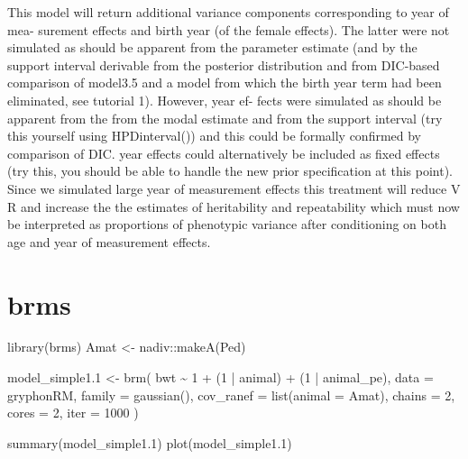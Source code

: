 \documentclass[
  12pt,
]{book}
\newenvironment{Shaded}{\begin{snugshade}}{\end{snugshade}}
\newcommand{\AttributeTok}[1]{\textcolor[rgb]{0.77,0.63,0.00}{#1}}
\newcommand{\DecValTok}[1]{\textcolor[rgb]{0.00,0.00,0.81}{#1}}
\newcommand{\FloatTok}[1]{\textcolor[rgb]{0.00,0.00,0.81}{#1}}
\newcommand{\FunctionTok}[1]{\textcolor[rgb]{0.00,0.00,0.00}{#1}}
\newcommand{\NormalTok}[1]{#1}
\newcommand{\OtherTok}[1]{\textcolor[rgb]{0.56,0.35,0.01}{#1}}
\newcommand{\SpecialCharTok}[1]{\textcolor[rgb]{0.00,0.00,0.00}{#1}}
\begin{document}
This model will return additional variance components corresponding to year of mea- surement effects and birth year (of the female effects). The latter were not simulated as should be apparent from the parameter estimate (and by the support interval derivable from the posterior distribution and from DIC-based comparison of model3.5 and a model from which the birth year term had been eliminated, see tutorial 1). However, year ef- fects were simulated as should be apparent from the from the modal estimate and from the support interval (try this yourself using HPDinterval()) and this could be formally confirmed by comparison of DIC. year effects could alternatively be included as fixed effects (try this, you should be able to handle the new prior specification at this point). Since we simulated large year of measurement effects this treatment will reduce V R and increase the the estimates of heritability and repeatability which must now be interpreted as proportions of phenotypic variance after conditioning on both age and year of measurement effects.

\hypertarget{brms-3}{%
\section{brms}\label{brms-3}}

\begin{Shaded}
\begin{Highlighting}[]
\FunctionTok{library}\NormalTok{(brms)}
\NormalTok{Amat }\OtherTok{\textless{}{-}}\NormalTok{ nadiv}\SpecialCharTok{::}\FunctionTok{makeA}\NormalTok{(Ped)}

\NormalTok{model\_simple1}\FloatTok{.1} \OtherTok{\textless{}{-}} \FunctionTok{brm}\NormalTok{(}
\NormalTok{  bwt }\SpecialCharTok{\textasciitilde{}} \DecValTok{1} \SpecialCharTok{+}\NormalTok{ (}\DecValTok{1} \SpecialCharTok{|}\NormalTok{ animal) }\SpecialCharTok{+}\NormalTok{ (}\DecValTok{1} \SpecialCharTok{|}\NormalTok{ animal\_pe),}
  \AttributeTok{data =}\NormalTok{ gryphonRM,}
  \AttributeTok{family =} \FunctionTok{gaussian}\NormalTok{(), }\AttributeTok{cov\_ranef =} \FunctionTok{list}\NormalTok{(}\AttributeTok{animal =}\NormalTok{ Amat),}
  \AttributeTok{chains =} \DecValTok{2}\NormalTok{, }\AttributeTok{cores =} \DecValTok{2}\NormalTok{, }\AttributeTok{iter =} \DecValTok{1000}
\NormalTok{)}

\FunctionTok{summary}\NormalTok{(model\_simple1}\FloatTok{.1}\NormalTok{)}
\FunctionTok{plot}\NormalTok{(model\_simple1}\FloatTok{.1}\NormalTok{)}
\end{Highlighting}
\end{Shaded}
\end{document}
